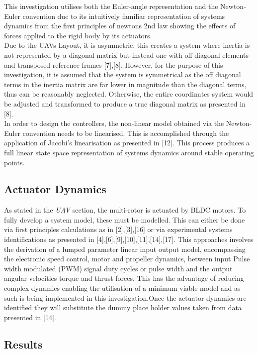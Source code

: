 \documentclass[12pt,a4paper,twoside]{report}
\begin{document}
				This investigation utilises both the Euler-angle representation and the Newton-Euler convention due to its intuitively familiar representation of systems dynamics from the first principles of newtons 2nd law showing the effects of forces applied to the rigid body by its actuators.
				\\
				Due to the UAVs Layout, it is asymmetric, this creates a system where inertia is not represented by a diagonal matrix but instead one with off diagonal elements and transposed reference frames [7],[8]. However, for the purpose of this investigation, it is assumed that the system is symmetrical as the off diagonal terms in the inertia matrix are far lower in magnitude than the diagonal terms, thus can be reasonably neglected. Otherwise, the entire coordinates system would be adjusted and transformed to produce a true diagonal matrix as presented in [8].
				\\
				In order to design the controllers, the non-linear model obtained via the Newton-Euler convention needs to be linearised. This is accomplished through the application of Jacobi's linearisation as presented in [12]. This process produces a full linear state space representation of systems dynamics around stable operating points. 
				
			\subsection*{Actuator Dynamics}
			
				As stated in the \emph{UAV} section, the multi-rotor is actuated by BLDC motors. To fully develop a system model, these must be modelled. This can either be done via first principles calculations as in [2],[3],[16] or via experimental systems identifications as presented in [4],[6],[9],[10],[11],[14],[17]. This approaches involves the derivation of a lumped parameter linear input output model, encompassing the electronic speed control, motor and propeller dynamics, between input Pulse width modulated (PWM) signal duty cycles or pulse width and the output angular velocities torque and thrust forces. This has the advantage of reducing complex dynamics enabling the utilisation of a minimum viable model and as such is being implemented in this investigation.Once the actuator dynamics are identified they will substitute the dummy place holder values taken from data presented in [14].
			
			\subsection*{Results}
			
\end{document}

